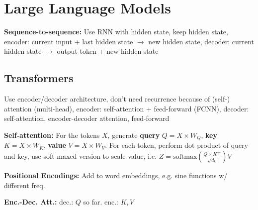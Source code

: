\section*{Large Language Models}
\textbf{Sequence-to-sequence:} Use RNN with hidden state, keep hidden state, encoder: 
current input + last hidden state $\rightarrow$ new hidden state, decoder: 
current hidden state $\rightarrow$ output token + new hidden state

\subsection*{Transformers}
Use encoder/decoder architecture, don't need recurrence because of (self-) attention (multi-head), 
encoder: self-attention + feed-forward (FCNN), decoder: self-attention, encoder-decoder attention, 
feed-forward

\textbf{Self-attention:} For the tokens $X$, generate 
\textbf{query} $Q = X \times W_Q$, \textbf{key} $K = X \times W_K$, \textbf{value} $V = X \times W_V$. 
For each token, perform dot product of query and key, use soft-maxed version to scale value, 
i.e. $Z = \text{softmax}(\frac{Q \times K\top}{\sqrt{d_k}}) V$

\textbf{Positional Encodings:} Add to word embeddings, e.g. sine functions w/ different freq.

\textbf{Enc.-Dec. Att.:} dec.: $Q$ so far. enc.: $K, V$